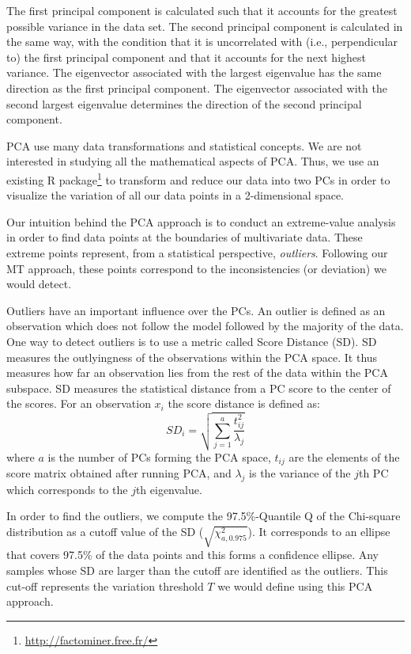 The first principal component is calculated such that it accounts for the greatest possible variance in the data set. The second principal component is calculated in the same way, with the condition that it is uncorrelated with (i.e., perpendicular to) the first principal component and that it accounts for the next highest variance. The eigenvector associated with the largest eigenvalue has the same direction as the first principal component. The eigenvector associated with the second largest eigenvalue determines the direction of the second principal component.

PCA use many data transformations and statistical concepts. We are not interested in studying all the mathematical aspects of PCA. Thus, we use an existing R package\footnote{\url{http://factominer.free.fr/}} to transform and reduce our data into two PCs in order to visualize the variation of all our data points in a 2-dimensional space.

Our intuition behind the PCA approach is to conduct an extreme-value analysis in order to find data points at the boundaries of multivariate data. These extreme points represent, from a statistical perspective, \textit{outliers}. Following our MT approach, these points correspond to the inconsistencies (or deviation) we would detect. 

Outliers have an important influence over the PCs. An outlier is defined as an observation which does not follow the model followed by the majority of the data.
One way to detect outliers is to use a metric called Score Distance (SD). SD measures the outlyingness of the observations within the PCA space. It thus measures how far an observation lies from the rest of the data within the PCA subspace. 
SD measures the statistical distance from a PC score to the center of the scores. For an observation $x_{i}$ the  score distance is defined as:
\begin{equation}
SD_{i}=\sqrt{\sum_{j=1}^{a} \frac{t_{ij}^{2}}{\lambda_{j}}}
\end{equation}
where $a$ is the number of PCs forming the PCA space, $t_{ij}$ are the elements of the score matrix obtained after running PCA, and $\lambda_{j}$ is the variance of the $j$th PC which corresponds to the $j$th eigenvalue.

In order to find the outliers, we compute the 97.5\%-Quantile Q of the Chi-square distribution as a cutoff value of the SD ($\sqrt{\chi_{a,0.975}^{2} }$). It corresponds to an ellipse that covers 97.5\% of the data points and this forms a confidence ellipse.
Any samples whose SD are larger than the cutoff are identified as the outliers. This cut-off represents the variation threshold $T$ we would define using this PCA approach.

